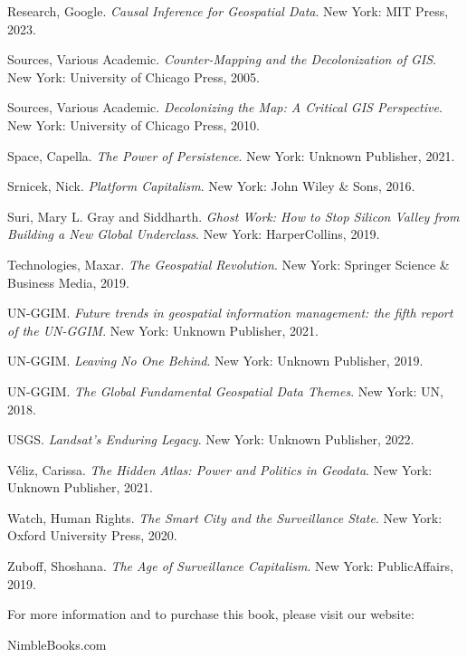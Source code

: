 \begin{hangparas}{0.15in}{1}
Research, Google. \t\textit{Causal Inference for Geospatial Data}. New York: MIT Press, 2023.

Sources, Various Academic. \t\textit{Counter-Mapping and the Decolonization of GIS}. New York: University of Chicago Press, 2005.

Sources, Various Academic. \t\textit{Decolonizing the Map: A Critical GIS Perspective}. New York: University of Chicago Press, 2010.

Space, Capella. \t\textit{The Power of Persistence}. New York: Unknown Publisher, 2021.

Srnicek, Nick. \t\textit{Platform Capitalism}. New York: John Wiley & Sons, 2016.

Suri, Mary L. Gray and Siddharth. \t\textit{Ghost Work: How to Stop Silicon Valley from Building a New Global Underclass}. New York: HarperCollins, 2019.

Technologies, Maxar. \t\textit{The Geospatial Revolution}. New York: Springer Science & Business Media, 2019.

UN-GGIM. \t\textit{Future trends in geospatial information management: the fifth report of the UN-GGIM}. New York: Unknown Publisher, 2021.

UN-GGIM. \t\textit{Leaving No One Behind}. New York: Unknown Publisher, 2019.

UN-GGIM. \t\textit{The Global Fundamental Geospatial Data Themes}. New York: UN, 2018.

USGS. \t\textit{Landsat's Enduring Legacy}. New York: Unknown Publisher, 2022.

Véliz, Carissa. \t\textit{The Hidden Atlas: Power and Politics in Geodata}. New York: Unknown Publisher, 2021.

Watch, Human Rights. \t\textit{The Smart City and the Surveillance State}. New York: Oxford University Press, 2020.

Zuboff, Shoshana. \t\textit{The Age of Surveillance Capitalism}. New York: PublicAffairs, 2019.

\end{hangparas}

\cleardoublepage

\vfill
\begin{center}
For more information and to purchase this book, please visit our website:
\par\vspace{1em}
NimbleBooks.com
\end{center}
\cleardoublepage
